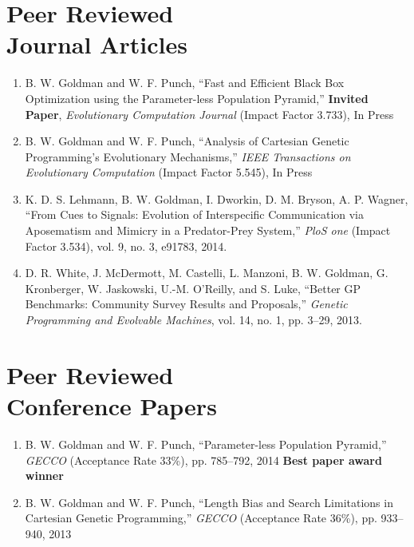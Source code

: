 \documentclass[margin,line]{resume}
\begin{document}
\begin{resume}
    \section{\mysidestyle Peer Reviewed\\Journal Articles}

    \begin{enumerate}
    \item
    B. W. Goldman and W. F. Punch,
    ``Fast and Efficient Black Box Optimization using the Parameter-less Population Pyramid,''
    \textbf{Invited Paper}, \textsl{Evolutionary Computation Journal} (Impact Factor 3.733), In Press

    \item
    B. W. Goldman and W. F. Punch,
    ``Analysis of Cartesian Genetic Programming's Evolutionary Mechanisms,''
    \textsl{IEEE Transactions on Evolutionary Computation} (Impact Factor 5.545), In Press

    \item
    K. D. S. Lehmann,  B. W. Goldman, I. Dworkin, D. M. Bryson, A. P. Wagner,
    ``From Cues to Signals: Evolution of Interspecific Communication via Aposematism and Mimicry in a Predator-Prey System,''
    \textsl{PloS one} (Impact Factor 3.534), vol. 9, no. 3, e91783, 2014.

    \item
    D. R. White, J. McDermott, M. Castelli, L. Manzoni, B. W. Goldman,
    G. Kronberger, W. Jaskowski, U.-M. O'Reilly, and S. Luke,
    ``Better GP Benchmarks: Community Survey Results and Proposals,''
    \textsl{Genetic Programming and Evolvable Machines}, vol. 14, no. 1, pp. 3--29, 2013.    
    \end{enumerate}

    \section{\mysidestyle Peer Reviewed\\Conference Papers}
    \begin{enumerate}
    
    \item
    B. W. Goldman and W. F. Punch,
    ``Parameter-less Population Pyramid,''
    \textsl{GECCO} (Acceptance Rate 33\%), pp. 785--792, 2014
    \textbf{Best paper award winner}
        
    \item
    B. W. Goldman and W. F. Punch,
    ``Length Bias and Search Limitations in Cartesian Genetic Programming,''
    \textsl{GECCO} (Acceptance Rate 36\%), pp. 933--940, 2013


\end{enumerate}
\end{resume}
\end{document}

